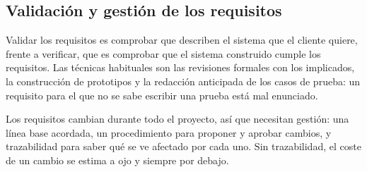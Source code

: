 \subsection*{Validación y gestión de los requisitos}

Validar los requisitos es comprobar que describen el sistema que el cliente quiere,
frente a verificar, que es comprobar que el sistema construido cumple los
requisitos. Las técnicas habituales son las revisiones formales con los
implicados, la construcción de prototipos y la redacción anticipada de los casos
de prueba: un requisito para el que no se sabe escribir una prueba está mal
enunciado.

Los requisitos cambian durante todo el proyecto, así que necesitan gestión: una
línea base acordada, un procedimiento para proponer y aprobar cambios, y
trazabilidad para saber qué se ve afectado por cada uno. Sin trazabilidad, el
coste de un cambio se estima a ojo y siempre por debajo.
